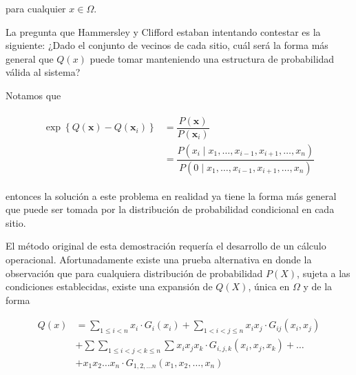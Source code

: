 para cualquier $x \in \Omega$.

La pregunta que Hammersley y Clifford estaban intentando contestar es la siguiente: ¿Dado el conjunto de vecinos de cada sitio, cuál será la forma más general que $Q(x)$ puede tomar manteniendo una estructura de probabilidad válida al sistema?

Notamos que 

\begin{equation}
    \begin{split}
        \begin{aligned} \exp \left\{ Q ( \mathbf { x } ) - Q \left( \mathbf { x } _ { i } \right) \right\} & = \dfrac{P ( \mathbf { x } )} { P \left( \mathbf { x } _ { i } \right)} \\ 
        &= \dfrac{P \left( x _ { i } \; | \; x _ { 1 } , \ldots , x _ { i - 1 } , x _ { i + 1 } , \ldots , x _ { n } \right) }{ P \left( 0 \; | \; x _ { 1 } , \ldots , x _ { i - 1 } , x _ { i + 1 } , \ldots , x _ { n } \right)}  \end{aligned}
    \end{split}
\end{equation}

entonces la solución a este problema en realidad ya tiene la forma más general que puede ser tomada por la distribución de probabilidad condicional en cada sitio.


El método original de esta demostración requería el desarrollo de un cálculo operacional. Afortunadamente existe una prueba alternativa en donde la observación que para cualquiera distribución de probabilidad $P(X)$, sujeta a las condiciones establecidas, existe una expansión de $Q(X)$, única en $\Omega$ y de la forma


    \begin{equation}
        \begin{split} 
        Q ( x ) &= \sum _ { 1 \leq i < n } x _ { i }  \cdot G _ { i } \left( x _ { i } \right) + \sum _ { 1 < i < j \leqslant n } x _ { i } x _ { j } \cdot G _ { i j } \left( x _ { i } , x _ { j } \right)\\
        &+  \sum \sum _ { 1 \leqslant i < j < k \leqslant n} \sum _ {  } x _ { i } x _ { j } x _ { k } \cdot G _ { i , j , k } \left( x _ { i } , x _ { j } , x _ { k } \right) + \ldots \\ 
        &+ x _ { 1 } x _ { 2 } \ldots x _ { n } \cdot G _ { 1,2 , \ldots n } \left( x _ { 1 } , x _ { 2 } , \ldots , x _ { n } \right) 
        \end{split}
        \end{equation}



